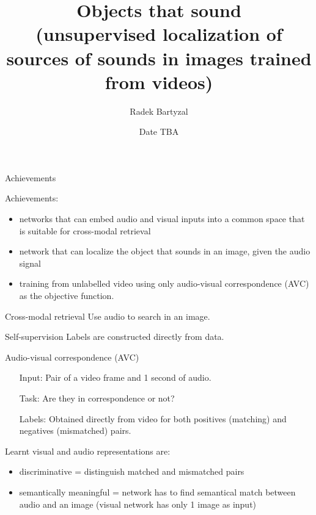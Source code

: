 \documentclass{beamer}
\begin{document}
\title{Objects that sound \\(unsupervised localization of sources of sounds in images trained from videos)}  
\author{Radek Bartyzal}
\date{Date TBA} 

\frame{\titlepage} 

\begin{frame}{Achievements}

Achievements:

\begin{itemize}

\item networks that can embed audio and visual inputs into a common space that is suitable for cross-modal retrieval
\medskip
\item network that can localize the object that sounds in an image, given the audio signal
\medskip
\item training from unlabelled video using only audio-visual correspondence (AVC) as the objective function. 
\end{itemize}
\medskip

\begin{block}{Cross-modal retrieval}
Use audio to search in an image.
\end{block}

\begin{block}{Self-supervision}
Labels are constructed directly from data.
\end{block}

\end{frame}

\begin{frame}{Audio-visual correspondence (AVC)}

\begin{itemize}
\item[Input:] Pair of a video frame and 1 second of audio.
\medskip
\item[Task:] Are they in correspondence or not?
\medskip
\item[Labels:] Obtained directly from video for both positives
(matching) and negatives (mismatched) pairs. 
\end{itemize}

\vfill

Learnt visual and audio representations are:
\begin{itemize}
\item discriminative = distinguish matched and mismatched pairs
\item semantically meaningful = network has to find semantical match between audio and an image (visual network has only 1 image as input)
\end{itemize}

\end{frame}
\end{document}
